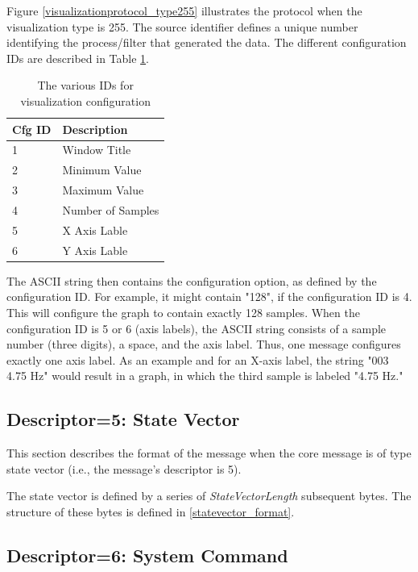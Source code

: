 \documentclass[letterpaper,oneside,12pt]{book}
\begin{document}
Figure \ref{visualizationprotocol_type255} illustrates the protocol when the 
visualization type is 255. The source identifier defines a unique number 
identifying the process/filter that generated the data. The different 
configuration IDs are described in Table \ref{tab:viscfg_table}.

\begin{table}[ht]
 \centering
 \begin{tabular}{|l|l|}
  \hline
  \textbf{Cfg ID} & \textbf{Description} \\
  \hline
  1 & Window Title \\
  \hline
  2 & Minimum Value \\
  \hline
  3 & Maximum Value \\
  \hline
  4 & Number of Samples \\
  \hline
  5 & X Axis Lable \\
  \hline
  6 & Y Axis Lable \\
  \hline
 \end{tabular}
 \caption{The various IDs for visualization configuration}
 \label{tab:viscfg_table}
\end{table} 

The ASCII string then contains the configuration option, as defined by the 
configuration ID. For example, it might contain "128", if the configuration ID 
is 4. This will configure the graph to contain exactly 128 samples. When the 
configuration ID is 5 or 6 (axis labels), the ASCII string consists of a sample 
number (three digits), a space, and the axis label. Thus, one message configures 
exactly one axis label. As an example and for an X-axis label, the string "003 
4.75 Hz" would result in a graph, in which the third sample is labeled "4.75 
Hz."


\subsection{Descriptor=5: State Vector}
\label{statevector}

This section describes the format of the message when the core message is of 
type state vector (i.e., the message's descriptor is 5). 

The state vector is defined by a series of \textit{StateVectorLength} subsequent 
bytes. The structure of these bytes is defined in \ref{statevector_format}.


\subsection{Descriptor=6: System Command}
\label{sec:syscmd}
\end{document}
